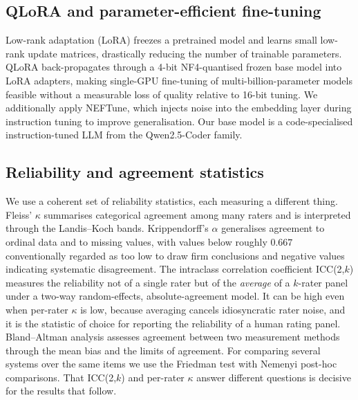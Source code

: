 \documentclass[sageh]{sagej}
\begin{document}
\subsection{QLoRA and parameter-efficient fine-tuning}
Low-rank adaptation (LoRA) freezes a pretrained model and learns small low-rank update matrices, drastically reducing the number of trainable parameters.\cite{hu2021lora} QLoRA back-propagates through a 4-bit NF4-quantised frozen base model into LoRA adapters, making single-GPU fine-tuning of multi-billion-parameter models feasible without a measurable loss of quality relative to 16-bit tuning.\cite{dettmers2023qlora,yang2025lora} We additionally apply NEFTune, which injects noise into the embedding layer during instruction tuning to improve generalisation.\cite{jain2023neftune} Our base model is a code-specialised instruction-tuned LLM from the Qwen2.5-Coder family.\cite{hui2024qwen25coder}

\subsection{Reliability and agreement statistics}
We use a coherent set of reliability statistics, each measuring a different thing. Fleiss' $\kappa$ summarises categorical agreement among many raters and is interpreted through the Landis--Koch bands.\cite{fleiss1971kappa,landis1977agreement} Krippendorff's $\alpha$ generalises agreement to ordinal data and to missing values, with values below roughly $0.667$ conventionally regarded as too low to draw firm conclusions and negative values indicating systematic disagreement.\cite{krippendorff2018content,marzi2024kalpha} The intraclass correlation coefficient ICC(2,$k$) measures the reliability not of a single rater but of the \emph{average} of a $k$-rater panel under a two-way random-effects, absolute-agreement model. It can be high even when per-rater $\kappa$ is low, because averaging cancels idiosyncratic rater noise, and it is the statistic of choice for reporting the reliability of a human rating panel.\cite{shrout1979icc,mcgraw1996icc,ruan2024divergent} Bland--Altman analysis assesses agreement between two measurement methods through the mean bias and the limits of agreement.\cite{bland1986agreement} For comparing several systems over the same items we use the Friedman test with Nemenyi post-hoc comparisons.\cite{demsar2006comparisons} That ICC(2,$k$) and per-rater $\kappa$ answer different questions is decisive for the results that follow.

\end{document}
